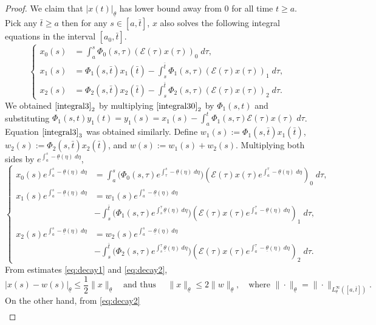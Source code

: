\documentclass[a4paper,11pt]{article}
\newcommand{\tl}{{\underline{\theta}}}
\newcommand{\bt}{{\bar{t}}}
\newcommand{\E}{\mathcal{E}}
\theoremstyle{remark}
\begin{document}
\begin{proof}
We claim that $|x(t)|_\tl$ has lower bound away from $0$ for all time $t\ge a$. Pick any $\bar{t} \ge a$ then for any $s \in [a,\bar{t}]$, $x$ also solves the following integral equations in the interval $[a_0,\bt]$.
\begin{equation} \label{integral3}
\left\{ \begin{aligned}
x_0(s) &= \int_a^s \Phi_0(s,\tau) (\E(\tau)x(\tau))_0 \; d\tau,\\
x_1(s) &= \Phi_1(s,\bar{t})x_1(\bar{t}) - \int_s^{\bar{t}} \Phi_1(s,\tau) (\E(\tau)x(\tau))_1 \; d\tau,\\
x_2(s) &= \Phi_2(s,\bar{t})x_2(\bar{t}) - \int_s^{\bar{t}} \Phi_2(s,\tau) (\E(\tau)x(\tau))_2 \; d\tau.
\end{aligned}\right.
\end{equation}
We obtained $\eqref{integral3}_2$  by multiplying $\eqref{integral30}_2$  by $\Phi_1(s,t)$ and substituting $\Phi_1(s,t)y_1(t) = y_1(s) = x_1(s) - \int_a^t \Phi_1(s,\tau)\E(\tau) x(\tau) \; d\tau$. Equation $\eqref{integral3}_3$ was obtained similarly. Define $w_1(s):=\Phi_1(s,\bar{t})x_1(\bar{t})$, $w_2(s):=\Phi_2(s,\bar{t})x_2(\bar{t})$, and $w(s) := w_1(s)+w_2(s)$. Multiplying both sides by $e^{\int_a^s -\tl(\eta) \; d\eta}$,
\begin{equation} \label{integral4}
\left\{ \begin{aligned}
x_0(s)e^{\int_a^s -\tl(\eta) \; d\eta} &= \int_a^s \big(\Phi_0(s,\tau)e^{\int_\tau^s -\tl(\eta) \; d\eta}\big) (\E(\tau)x(\tau)e^{\int_a^\tau -\tl(\eta) \; d\eta})_0 \; d\tau,\\
x_1(s)e^{\int_a^s -\tl(\eta) \; d\eta} &= w_1(s)e^{\int_a^s -\tl(\eta) \; d\eta} \\
&- \int_s^{\bar{t}} \big(\Phi_1(s,\tau)e^{\int_s^\tau \tl(\eta) \; d\eta}\big) (\E(\tau)x(\tau)e^{\int_a^\tau -\tl(\eta) \; d\eta})_1 \; d\tau,\\
x_2(s)e^{\int_a^s -\tl(\eta) \; d\eta} &= w_2(s)e^{\int_a^s -\tl(\eta) \; d\eta}\\
&- \int_s^{\bar{t}} \big(\Phi_2(s,\tau)e^{\int_s^\tau \tl(\eta) \; d\eta}\big) (\E(\tau)x(\tau)e^{\int_a^\tau -\tl(\eta) \; d\eta})_2 \; d\tau.
\end{aligned}\right.
\end{equation}
From estimates \eqref{eq:decay1} and \eqref{eq:decay2},
$$|x(s)-w(s)|_\tl \le \frac{1}{2} \|x\|_\tl \quad \text{and thus } \quad \|x\|_\tl \le 2\|w\|_\tl, \quad \text{where $\|\cdot\|_\tl = \|\cdot\|_{L^\infty_\tl ([a,\bt])}$}.$$
On the other hand, from \eqref{eq:decay2}
\begin{align*}

\end{align*}
\end{proof}
\end{document}
